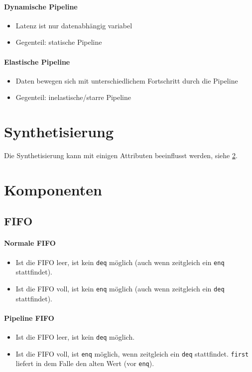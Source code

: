 			\paragraph{Dynamische Pipeline}
				\begin{itemize}
					\item Latenz ist nur datenabhängig variabel
					\item Gegenteil: statische Pipeline
				\end{itemize}

			\paragraph{Elastische Pipeline}
				\begin{itemize}
					\item Daten bewegen sich mit unterschiedlichem Fortschritt durch die Pipeline
					\item Gegenteil: inelastische/starre Pipeline
				\end{itemize}

	\section{Synthetisierung}
		Die Synthetisierung kann mit einigen Attributen beeinflusst werden, siehe \ref{sec:bsvkomponenten}.

	\section{Komponenten}
		\label{sec:bsvkomponenten}

		\subsection{FIFO}
			\paragraph{Normale FIFO}
				\begin{itemize}
					\item Ist die FIFO leer, ist kein \texttt{deq} möglich (auch wenn zeitgleich ein \texttt{enq} stattfindet).
					\item Ist die FIFO voll, ist kein \texttt{enq} möglich (auch wenn zeitgleich ein \texttt{deq} stattfindet).
				\end{itemize}

			\paragraph{Pipeline FIFO}
				\begin{itemize}
					\item Ist die FIFO leer, ist kein \texttt{deq} möglich.
					\item Ist die FIFO voll, ist \texttt{enq} möglich, wenn zeitgleich ein \texttt{deq} stattfindet. \texttt{first} liefert in dem Falle den alten Wert (vor \texttt{enq}).
				\end{itemize}

